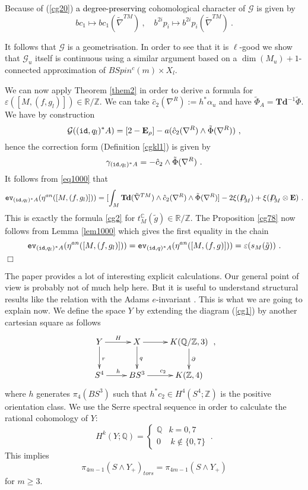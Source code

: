 \documentclass[12pt]{article}
\newcommand{\ev}{{\tt ev}}
\newcommand{\id}{{\tt id}}
\newcommand{\cG}{{\mathcal{G}}}
\def\hB{\hspace*{\fill}$\Box$ \newline\noindent}
\newcommand{\Z}{{\mathbb{Z}}}
\newcommand{\Q}{{\mathbb{Q}}}
\newcommand{\R}{{\mathbb{R}}}
\newcommand{\C}{{\mathbb{C}}}
\newcommand{\Td}{{\mathbf{Td}}}
\newcommand{\bE}{{\mathbf{E}}}
\newcommand{\Dirac}{{D\hspace{-0.27cm}/}}
\begin{document}
 Because of (\ref{cg20}) \textcolor{black}{a degree-preserving}
cohomological character of $\cG$ is given by 
$$bc_{1}\mapsto bc_{1}(\tilde \nabla^{TM})\ ,\quad  b^{2i}p_{i}\mapsto b^{2i}p_{i}(\tilde \nabla^{TM})\ .$$
 

It follows that $\cG$ is a geometrisation. In order to see that it is $\ell$-good we show that
$\cG_{u}$ itself is continuous using a similar argument based on a $\dim(M_{u})+1$-connected approximation of $BSpin^{c}(m)\times X_{l}$.

We can now apply  Theorem \ref{them2} in order to derive a formula for $\varepsilon([M,(f,g_{l})])\in \R/\Z$.
We can take $\hat c_{2}(\nabla^{R}):=h^{*}\alpha_{u}$ and have
$\tilde \Phi_{A}=\Td^{-1} \tilde \Phi$.
We have by construction
$$\cG((\id,q_{l})^{*}A)=[2-\bE_{\rho}]-a(\hat c_{2}(\nabla^{R})\wedge  \tilde \Phi(\nabla^{R}) )\ ,$$
hence the correction form (Definition  \ref{cgkl1}) is given by
$$\gamma_{(\id,q_{l})^{*}A}=-\hat c_{2}\wedge   \tilde \Phi(\nabla^{R}) \ .$$
It follows from \eqref{eq1000} that
$$\ev_{(\id,q_{l})^{*}A}(\eta^{an}([M,(f,g_{l})]))=[\int_{M}\Td(\tilde \nabla^{TM})\wedge \hat c_{2}(\nabla^{R})\wedge  \tilde \Phi(\nabla^{R})] -2\xi(\Dirac_{M})+\xi(\Dirac_{M}\otimes \bE)\ .$$
This is exactly the formula \eqref{cg2} for $t^{\C}_{M}(\tilde g)\in \R/\Z$. 
The Proposition \ref{cg78} now follows from Lemma \ref{lem1000} which gives the first equality in the chain
$$\ev_{(\id,q_{l})^{*}A}(\eta^{an}([M,(f,g_{l})]))=\ev_{(\id,q)^{*}A}(\eta^{an}([M,(f,g)]))=\varepsilon(s_{M}(\tilde g
))\ .$$
\hB 

The paper \cite{2010arXiv1012.5237C} provides a lot of interesting explicit calculations. 
Our general point of view is probably not of much help here. But it is useful to understand structural results like the relation with the Adams $e$-invariant \cite[Prop 1.11]{2010arXiv1012.5237C}. This is what we are going to explain now.
 We define the space $Y$ by extending the diagram  (\ref{cg1}) by another cartesian square as follows
\begin{equation}
\label{cg1v}
\xymatrix{Y\ar[r]^{H}\ar[d]^{r}&X\ar[d]^{q}\ar[r]&K(\Q/\Z,3)\ar[d]^{\partial} \\ 
S^{4}\ar[r]^{h}&BS^{3}\ar[r]^{c_{2}}&K(\Z,4)}   \  ,
\end{equation}
where $h$ generates $\pi_{4}(BS^{3})$
such that $h^{*}c_{2}\in H^{4}(S^{4};\Z)$ is the positive orientation class. 
We use the Serre spectral sequence in order to calculate the rational cohomology of $Y$:
$$H^{k}(Y;\Q)=\left\{
\begin{array}{cc}
\Q&k=0,7
\\0&\: k\not\in \{0,7\}\end{array}\right. \ .$$
This implies
\begin{equation}\label{cgh2}\pi_{4m-1}(S\wedge Y_{+})_{tors}=\pi_{4m-1}(S\wedge Y_{+})\end{equation}
for $m\ge 3$. 
\end{document}
